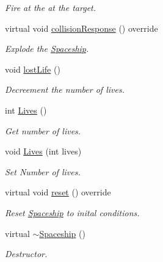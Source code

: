 \begin{DoxyCompactItemize}
\begin{DoxyCompactList}\small\item\em Fire at the at the target. \end{DoxyCompactList}\item 
\mbox{\label{class_spaceship_a47911214849b05082ee0876a3b8bac7a}} 
virtual void \mbox{\hyperlink{class_spaceship_a47911214849b05082ee0876a3b8bac7a}{collision\+Response}} () override
\begin{DoxyCompactList}\small\item\em Explode the \mbox{\hyperlink{class_spaceship}{Spaceship}}. \end{DoxyCompactList}\item 
\mbox{\label{class_spaceship_a8f1eabe7d82fe9d517266ce5f111d421}} 
void \mbox{\hyperlink{class_spaceship_a8f1eabe7d82fe9d517266ce5f111d421}{lost\+Life}} ()
\begin{DoxyCompactList}\small\item\em Decreement the number of lives. \end{DoxyCompactList}\item 
int \mbox{\hyperlink{class_spaceship_a5b7b351757965153332a4e66ef8e0b61}{Lives}} ()
\begin{DoxyCompactList}\small\item\em Get number of lives. \end{DoxyCompactList}\item 
void \mbox{\hyperlink{class_spaceship_a02a31fd44b5b9f60743d1e04f10fa113}{Lives}} (int lives)
\begin{DoxyCompactList}\small\item\em Set Number of lives. \end{DoxyCompactList}\item 
\mbox{\label{class_spaceship_a78bb6c136c35d3f43f3937732ccb1de2}} 
virtual void \mbox{\hyperlink{class_spaceship_a78bb6c136c35d3f43f3937732ccb1de2}{reset}} () override
\begin{DoxyCompactList}\small\item\em Reset \mbox{\hyperlink{class_spaceship}{Spaceship}} to inital conditions. \end{DoxyCompactList}\item 
\mbox{\label{class_spaceship_aaf51352795ea2382e2aaea4b9a058804}} 
virtual \mbox{\hyperlink{class_spaceship_aaf51352795ea2382e2aaea4b9a058804}{$\sim$\+Spaceship}} ()
\begin{DoxyCompactList}\small\item\em Destructor. \end{DoxyCompactList}\end{DoxyCompactItemize}
